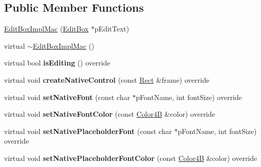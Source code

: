 \subsection*{Public Member Functions}
\begin{DoxyCompactItemize}
\item 
\hyperlink{classui_1_1EditBoxImplMac_ab297af48ff18727aa143ffcdc72c446f}{Edit\+Box\+Impl\+Mac} (\hyperlink{classui_1_1EditBox}{Edit\+Box} $\ast$p\+Edit\+Text)
\item 
virtual \hyperlink{classui_1_1EditBoxImplMac_a91500aa33e13594d48e8e76f78e3e307}{$\sim$\+Edit\+Box\+Impl\+Mac} ()
\item 
\mbox{\label{classui_1_1EditBoxImplMac_af02a251d248aee38823b825b0172b7a9}} 
virtual bool {\bfseries is\+Editing} () override
\item 
\mbox{\label{classui_1_1EditBoxImplMac_ac6704f3a1be81e9d9f007ddd0e5fe367}} 
virtual void {\bfseries create\+Native\+Control} (const \hyperlink{classRect}{Rect} \&frame) override
\item 
\mbox{\label{classui_1_1EditBoxImplMac_a6da47249d46c35e1729fd6dd33f9dba5}} 
virtual void {\bfseries set\+Native\+Font} (const char $\ast$p\+Font\+Name, int font\+Size) override
\item 
\mbox{\label{classui_1_1EditBoxImplMac_a2e02b198f759c8204218ed4ea4bdf060}} 
virtual void {\bfseries set\+Native\+Font\+Color} (const \hyperlink{structColor4B}{Color4B} \&color) override
\item 
\mbox{\label{classui_1_1EditBoxImplMac_a3f76f12fa5941e3b8d1dc1bb88b0d186}} 
virtual void {\bfseries set\+Native\+Placeholder\+Font} (const char $\ast$p\+Font\+Name, int font\+Size) override
\item 
\mbox{\label{classui_1_1EditBoxImplMac_a804b2d5df2a6c4a6dba4848b5e60d401}} 
virtual void {\bfseries set\+Native\+Placeholder\+Font\+Color} (const \hyperlink{structColor4B}{Color4B} \&color) override
\item 
\mbox{\label{classui_1_1EditBoxImplMac_abe3e2b8380d73c0da7da40768ff10401}} 

\end{DoxyCompactItemize}
